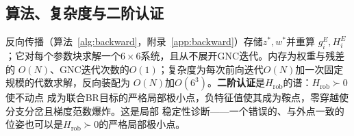 \subsection{算法、复杂度与二阶认证}

反向传播（算法~\ref{alg:backward}，附录~\ref{app:backward}）存储$z^*,w^*$并重算
$g_i^E,H_i^E$；它对每个参数块求解一个$6\times6$系统，且从不展开GNC迭代。内存为权重与残差的
$O(N)$、GNC迭代次数的$O(1)$；复杂度为每次前向迭代$O(N)$加一次固定规模的代数求解，反向装配为
$O(N)$加$O(6^3)$。\textbf{二阶认证}是$H_{\mathrm{rob}}$的谱：$H_{\mathrm{rob}}\succ0$使不动点
成为联合BR目标的严格局部极小点，负特征值使其成为鞍点，零穿越使分支分岔且梯度范数爆炸。这是局部
稳定性诊断——一个错误的、与外点一致的位姿也可以是$H_{\mathrm{rob}}\succ0$的严格局部极小点。
